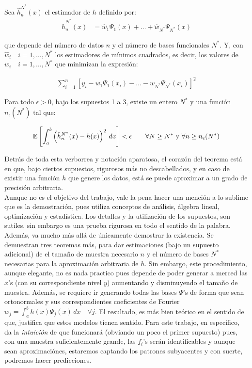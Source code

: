 \documentclass[../Main/Main.tex]{subfiles}
\begin{document}
\begin{theorem} \label{teo:ConvergenciaBerg}
	Sea $\hat{h}_n^{N^*}(x)$ el estimador de $h$ definido por:
	\begin{align}
		\hat{h}_n^{N^*}(x) &= \hat{w}_1\Psi_1(x) + \ldots + \hat{w}_{N^*}\Psi_{N^*}(x) \label{ec:hGorro}
	\end{align}

que depende del número de datos $n$ y el número de bases funcionales $N^*$. Y, con $\hat{w}_i\quad i = 1,\ldots,N^*$ los estimadores de mínimos cuadrados, es decir, los valores de $w_i\quad i = 1,\ldots,N^*$ que minimizan la expresión:

\begin{align}
	\sum_{i = 1}^n \left[y_i - w_1\Psi_1(x_i) - \ldots - w_{N^*}\Psi_{N^*}(x_i)\right]^2 \label{ec:MinCuadBerg}
\end{align}

Para todo $\epsilon > 0$, bajo los supuestos 1 a 3, existe un entero $N^*$ y una función $n_{\epsilon}(N^*)$ tal que:

\begin{align}
	\mathbb{E}\left[ \int_a^b \left(\hat{h}_n^{N^*}(x) - h(x)\right)^2 \,dx \right] < \epsilon \qquad \forall N \geq N^* \text{ y } \forall n \geq n_{\epsilon}(N^*) \label{ec:TeoremaBerg}
\end{align} 
\end{theorem}

Detrás de toda esta verborrea y notación aparatosa, el corazón del teorema está en que, bajo ciertos supuestos, rigurosos más no descabellados, y en caso de existir una función $h$ que genere los datos, está se puede aproximar a un grado de precisión arbitraria.\\ 

Aunque no es el objetivo del trabajo, vale la pena hacer una mención a lo sublime que es la demostración, pues utiliza conceptos de análisis, álgebra lineal, optimización y estadística. Los detalles y la utilización de los supuestos, son sutiles, sin embargo es una prueba rigurosa en todo el sentido de la palabra. Además,  \autocite{bergstrom1985estimation} va mucho más allá de únicamente demostrar la existencia. Se demuestran tres teoremas más, para dar estimaciones (bajo un supuesto adicional) de el tamaño de muestra necesario $n$ y el número de bases $N^*$ necesarias para la aproximación arbitraria de $h$. Sin embargo, este procedimiento, aunque elegante, no es nada practico pues depende de poder generar a merced las $x$'s (con su correspondiente nivel $y$) aumentando y disminuyendo el tamaño de muestra. Además, se requiere ir generando todas las bases $\Psi$'s de forma que sean ortonormales y sus correspondientes coeficientes de Fourier $w_j = \int_a^bh(x)\Psi_j(x)\,dx \quad \forall j$. El resultado, es más bien teórico en el sentido de que, justifica que estos modelos tienen sentido. Para este trabajo, en especifico, da la \textit{intuición} de que funcionará (obviando un poco el primer supuesto) pues, con una muestra suficientemente grande, las $f_i$'s serán identificables y aunque sean aproximaciónes, estaremos captando los patrones subyacentes y con suerte, podremos hacer predicciones. \\
\end{document}
